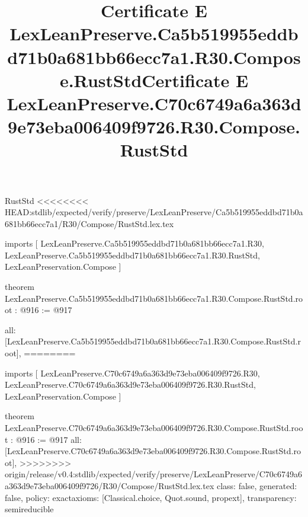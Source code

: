 \begin{lexlean}{RustStd}
<<<<<<<< HEAD:stdlib/expected/verify/preserve/LexLeanPreserve/Ca5b519955eddbd71b0a681bb66ecc7a1/R30/Compose/RustStd.lex.tex
\title{Certificate E LexLeanPreserve.Ca5b519955eddbd71b0a681bb66ecc7a1.R30.Compose.RustStd}
\begin{coremodule}
imports [
  LexLeanPreserve.Ca5b519955eddbd71b0a681bb66ecc7a1.R30,
  LexLeanPreserve.Ca5b519955eddbd71b0a681bb66ecc7a1.R30.RustStd,
  LexLeanPreservation.Compose
]

theorem LexLeanPreserve.Ca5b519955eddbd71b0a681bb66ecc7a1.R30.Compose.RustStd.root : @916 := @917 {
  all: [LexLeanPreserve.Ca5b519955eddbd71b0a681bb66ecc7a1.R30.Compose.RustStd.root],
========
\title{Certificate E LexLeanPreserve.C70c6749a6a363d9e73eba006409f9726.R30.Compose.RustStd}
\begin{coremodule}
imports [
  LexLeanPreserve.C70c6749a6a363d9e73eba006409f9726.R30,
  LexLeanPreserve.C70c6749a6a363d9e73eba006409f9726.R30.RustStd,
  LexLeanPreservation.Compose
]

theorem LexLeanPreserve.C70c6749a6a363d9e73eba006409f9726.R30.Compose.RustStd.root : @916 := @917 {
  all: [LexLeanPreserve.C70c6749a6a363d9e73eba006409f9726.R30.Compose.RustStd.root],
>>>>>>>> origin/release/v0.4:stdlib/expected/verify/preserve/LexLeanPreserve/C70c6749a6a363d9e73eba006409f9726/R30/Compose/RustStd.lex.tex
  class: false,
  generated: false,
  policy: exact{axioms: [Classical.choice, Quot.sound, propext]},
  transparency: semireducible
}


\end{coremodule}}
\end{coremodule}
\end{lexlean}

